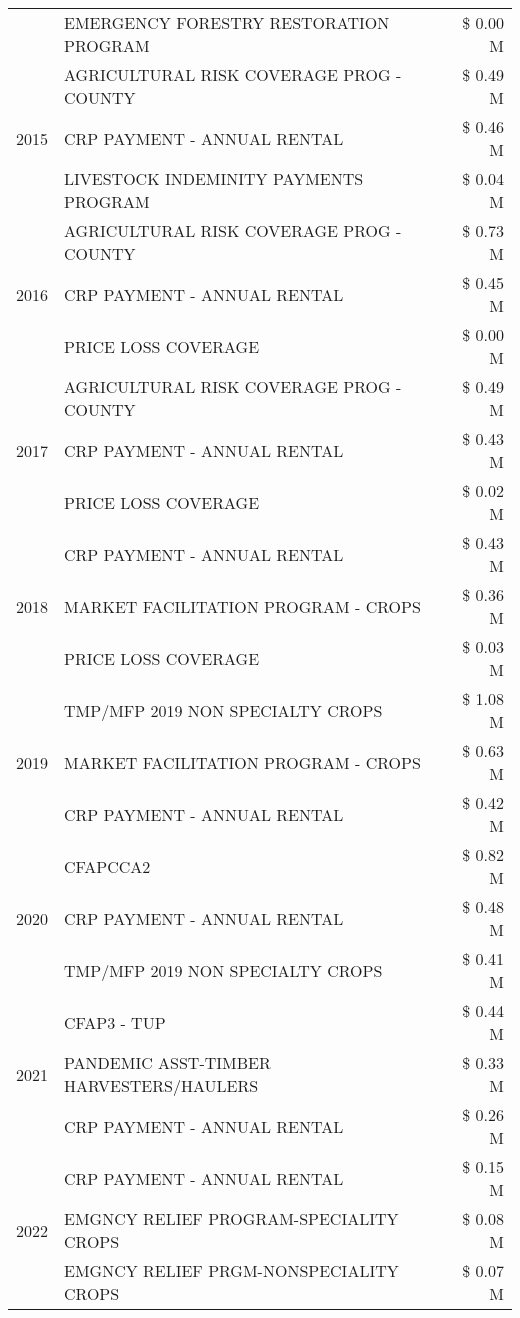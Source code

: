 \begin{tabular}{llr}
 & EMERGENCY FORESTRY RESTORATION PROGRAM & \$ 0.00 M \\
\cline{1-3}
\multirow[t]{3}{*}{2015} & AGRICULTURAL RISK COVERAGE PROG - COUNTY & \$ 0.49 M \\
 & CRP PAYMENT - ANNUAL RENTAL & \$ 0.46 M \\
 & LIVESTOCK INDEMINITY PAYMENTS PROGRAM & \$ 0.04 M \\
\cline{1-3}
\multirow[t]{3}{*}{2016} & AGRICULTURAL RISK COVERAGE PROG - COUNTY & \$ 0.73 M \\
 & CRP PAYMENT - ANNUAL RENTAL & \$ 0.45 M \\
 & PRICE LOSS COVERAGE & \$ 0.00 M \\
\cline{1-3}
\multirow[t]{3}{*}{2017} & AGRICULTURAL RISK COVERAGE PROG - COUNTY & \$ 0.49 M \\
 & CRP PAYMENT - ANNUAL RENTAL & \$ 0.43 M \\
 & PRICE LOSS COVERAGE & \$ 0.02 M \\
\cline{1-3}
\multirow[t]{3}{*}{2018} & CRP PAYMENT - ANNUAL RENTAL & \$ 0.43 M \\
 & MARKET FACILITATION PROGRAM - CROPS & \$ 0.36 M \\
 & PRICE LOSS COVERAGE & \$ 0.03 M \\
\cline{1-3}
\multirow[t]{3}{*}{2019} & TMP/MFP 2019 NON SPECIALTY CROPS & \$ 1.08 M \\
 & MARKET FACILITATION PROGRAM - CROPS & \$ 0.63 M \\
 & CRP PAYMENT - ANNUAL RENTAL & \$ 0.42 M \\
\cline{1-3}
\multirow[t]{3}{*}{2020} & CFAPCCA2 & \$ 0.82 M \\
 & CRP PAYMENT - ANNUAL RENTAL & \$ 0.48 M \\
 & TMP/MFP 2019 NON SPECIALTY CROPS & \$ 0.41 M \\
\cline{1-3}
\multirow[t]{3}{*}{2021} & CFAP3 - TUP & \$ 0.44 M \\
 & PANDEMIC ASST-TIMBER HARVESTERS/HAULERS & \$ 0.33 M \\
 & CRP PAYMENT - ANNUAL RENTAL & \$ 0.26 M \\
\cline{1-3}
\multirow[t]{3}{*}{2022} & CRP PAYMENT - ANNUAL RENTAL & \$ 0.15 M \\
 & EMGNCY RELIEF PROGRAM-SPECIALITY CROPS & \$ 0.08 M \\
 & EMGNCY RELIEF PRGM-NONSPECIALITY CROPS & \$ 0.07 M \\
\cline{1-3}
\bottomrule
\end{tabular}
